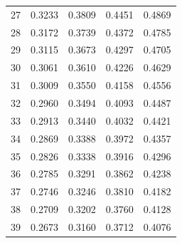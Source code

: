 \begin{minipage}[t]{0.49\textwidth}
\begin{tabular}{rrrrr}
		27 & 0.3233 & 0.3809 & 0.4451 & 0.4869 \\
		28 & 0.3172 & 0.3739 & 0.4372 & 0.4785 \\
		29 & 0.3115 & 0.3673 & 0.4297 & 0.4705 \\[5pt]
		30 & 0.3061 & 0.3610 & 0.4226 & 0.4629 \\
		31 & 0.3009 & 0.3550 & 0.4158 & 0.4556 \\
		32 & 0.2960 & 0.3494 & 0.4093 & 0.4487 \\
		33 & 0.2913 & 0.3440 & 0.4032 & 0.4421 \\
		34 & 0.2869 & 0.3388 & 0.3972 & 0.4357 \\
		35 & 0.2826 & 0.3338 & 0.3916 & 0.4296 \\
		36 & 0.2785 & 0.3291 & 0.3862 & 0.4238 \\
		37 & 0.2746 & 0.3246 & 0.3810 & 0.4182 \\
		38 & 0.2709 & 0.3202 & 0.3760 & 0.4128 \\
		39 & 0.2673 & 0.3160 & 0.3712 & 0.4076 \\
		\midrule
	\end{tabular}
\end{minipage}
\hfill
